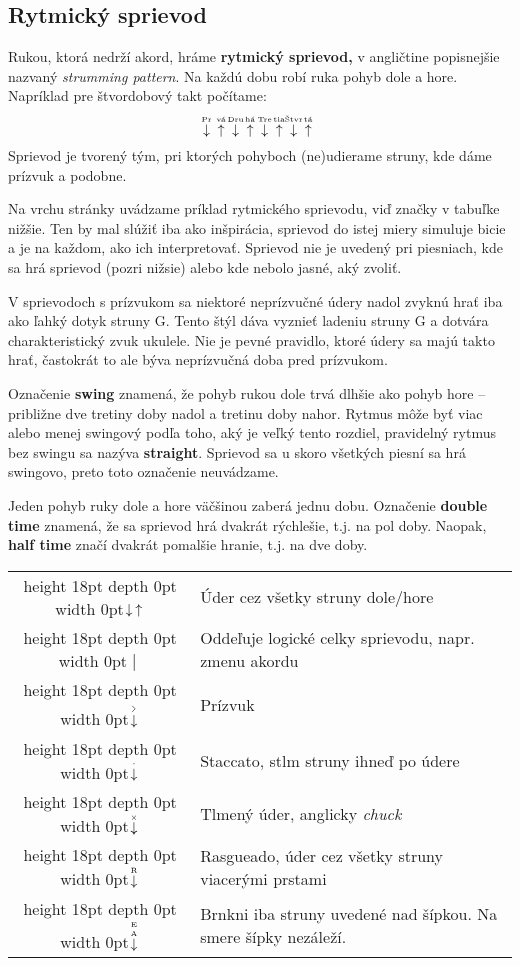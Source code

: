 \subsection*{Rytmický sprievod}

Rukou, ktorá nedrží akord, hráme \textbf{rytmický sprievod,} v angličtine popisnejšie nazvaný
\emph{strumming pattern}. Na každú dobu robí ruka pohyb dole a hore. Napríklad pre štvordobový
takt počítame:
{\larger$$
\PluckDown{Pr}\ \PluckUp{vá}\ \PluckDown{Dru}\ \PluckUp{há}\ 
\PluckDown{Tre}\ \PluckUp{tia}\ \PluckDown{Štvr}\ \PluckUp{tá}\ 
$$}%
Sprievod je tvorený tým, pri ktorých pohyboch (ne)udierame struny, kde dáme prízvuk a podobne.

Na vrchu stránky uvádzame príklad rytmického sprievodu, viď značky v tabuľke nižšie.
Ten by mal slúžiť iba ako inšpirácia, sprievod do istej miery simuluje bicie a je na každom, ako ich
interpretovať. Sprievod nie je uvedený pri piesniach, kde sa hrá \uv{štandardný} sprievod (pozri nižsie)
alebo kde nebolo jasné, aký zvoliť.

V sprievodoch s prízvukom sa niektoré neprízvučné údery nadol zvyknú hrať iba ako ľahký dotyk
struny G. Tento štýl dáva vyznieť ladeniu struny G a dotvára charakteristický zvuk ukulele.
Nie je pevné pravidlo, ktoré údery sa majú takto hrať, častokrát to ale býva neprízvučná doba pred
prízvukom.

Označenie \textbf{swing} znamená, že pohyb rukou dole trvá dlhšie ako pohyb hore -- približne
dve tretiny doby nadol a tretinu doby nahor. Rytmus môže byť viac alebo menej swingový podľa toho,
aký je veľký tento rozdiel, pravidelný rytmus bez swingu sa nazýva \textbf{straight}. Sprievod
sa u skoro všetkých piesní sa hrá swingovo, preto toto označenie neuvádzame.

Jeden pohyb ruky dole a hore väčšinou zaberá jednu dobu. Označenie \textbf{double time} znamená,
že sa sprievod hrá dvakrát rýchlešie, t.j. na pol doby. Naopak, \textbf{half time} značí dvakrát
pomalšie hranie, t.j. na dve doby.

\medskip

\def\mystrut{\vrule height 18pt depth 0pt width 0pt}
\begin{tabularx}{\linewidth}{ c X }
    \mystrut $\Down\Up$ & Úder cez všetky struny dole/hore \\ 
    \mystrut $\hspace{3pt}\big|\hspace{3pt}$ & Oddeľuje logické celky sprievodu, napr. zmenu akordu \\ 
    \mystrut $\AccentDown$ & Prízvuk \\  
    \mystrut $\StaccatoDown$ & Staccato, stlm struny ihneď po údere \\
    \mystrut $\ChuckDown$ & Tlmený úder, anglicky \textit{chuck} \\
    \mystrut $\PluckDown{R}$ & Rasgueado, \uv{vejárovitý} úder cez všetky struny viacerými prstami \\    
    \mystrut $\PluckDown{E A}$ & Brnkni iba struny uvedené nad šípkou. Na smere šípky nezáleží. \\
\end{tabularx}


